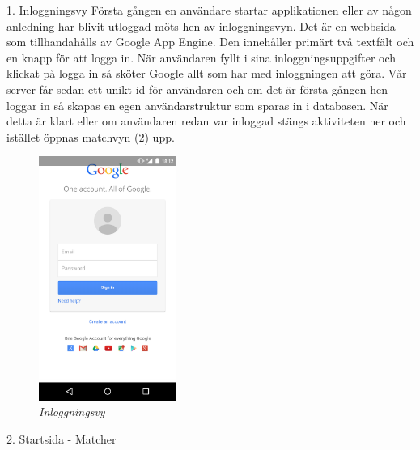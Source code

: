 \documentclass[a4paper, 11pt]{article}
\begin{document}
\large \textup{1. Inloggningsvy}
Första gången en användare startar applikationen eller av någon anledning har blivit utloggad möts hen av inloggningsvyn. Det är en webbsida som tillhandahålls av Google App Engine. Den innehåller primärt två textfält och en knapp för att logga in. När användaren fyllt i sina inloggningsuppgifter och klickat på logga in så sköter Google allt som har med inloggningen att  göra. Vår server får sedan ett unikt id för användaren och om det är första gången hen loggar in så skapas en egen användarstruktur som sparas in i databasen.
När detta är klart eller om användaren redan var inloggad stängs aktiviteten ner och istället öppnas matchvyn (2) upp. 
\begin{figure}[H]
	\begin{center}
	\includegraphics[width=0.4\textwidth]{app_login} 
	\end{center}
	\caption{\textit{Inloggningsvy}}
\end{figure}


\pagebreak
\large \textup{2. Startsida - Matcher}
\end{document}
